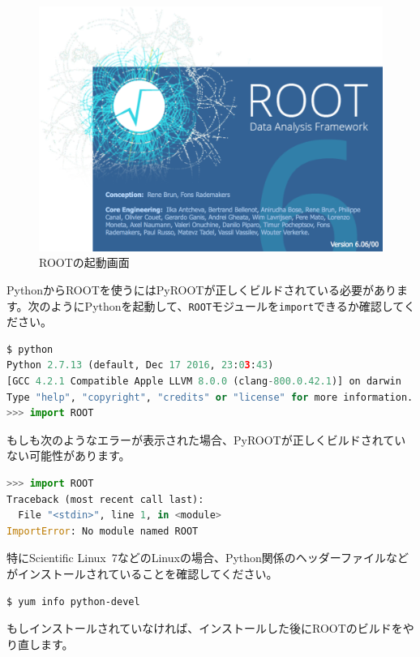 \begin{figure}
  \centering
  \includegraphics[width=12cm]{fig/splash6.png}
  \caption{ROOTの起動画面}
  \label{fig_splash}
\end{figure}

PythonからROOTを使うにはPyROOTが正しくビルドされている必要があります。次のようにPythonを起動して、\texttt{ROOT}モジュールを\texttt{import}できるか確認してください。
\begin{lstlisting}[language=python]
$ python
Python 2.7.13 (default, Dec 17 2016, 23:03:43) 
[GCC 4.2.1 Compatible Apple LLVM 8.0.0 (clang-800.0.42.1)] on darwin
Type "help", "copyright", "credits" or "license" for more information.
>>> import ROOT
\end{lstlisting}
もしも次のようなエラーが表示された場合、PyROOTが正しくビルドされていない可能性があります。
\begin{lstlisting}[language=python]
>>> import ROOT
Traceback (most recent call last):
  File "<stdin>", line 1, in <module>
ImportError: No module named ROOT
\end{lstlisting}
特にScientific Linux~7などのLinuxの場合、Python関係のヘッダーファイルなどがインストールされていることを確認してください。
\begin{lstlisting}[language=bash]
$ yum info python-devel
\end{lstlisting}
もしインストールされていなければ、インストールした後にROOTのビルドをやり直します。

